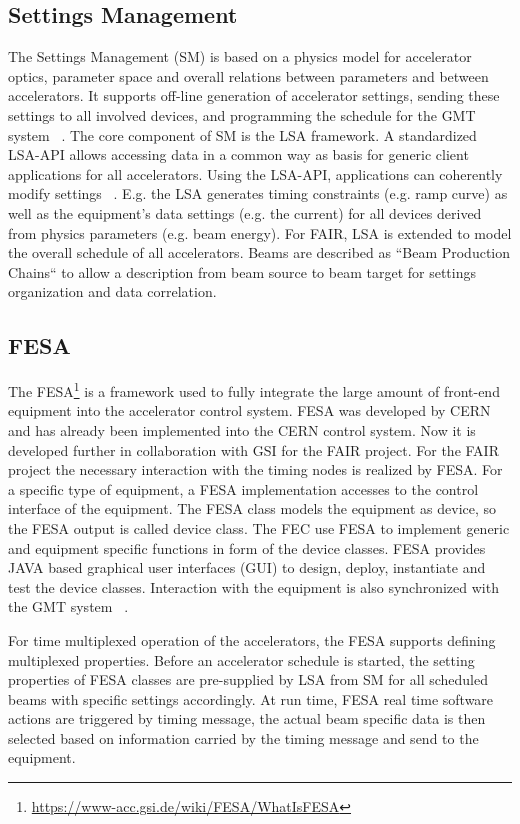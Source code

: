 \subsection{Settings Management}
The Settings Management (\gls{SM}) is based on a physics model for accelerator optics, parameter space and overall relations between parameters and between accelerators. It supports off-line generation of accelerator settings, sending these settings to all involved devices, and programming the schedule for the GMT system ~\cite{huhmann_fair_2013}. The core component of SM is the LSA framework. A standardized  LSA-\gls{API} allows accessing data in a common way as basis for generic client applications for all accelerators. Using the LSA-API, applications can coherently modify settings ~\cite{huhmann_fair_2013}. E.g. the LSA generates timing constraints (e.g. ramp curve) as well as the equipment's data settings (e.g. the current) for all devices derived from physics parameters (e.g. beam energy). For FAIR, LSA is extended to model the overall schedule of all accelerators. Beams are described as ``Beam Production Chains`` to allow a description from beam source to beam target for settings organization and data correlation.


\subsection{FESA}
The \gls{FESA}\footnote{\url{https://www-acc.gsi.de/wiki/FESA/WhatIsFESA}} is a framework used to fully integrate the large amount of front-end equipment into the accelerator control system. FESA was developed by CERN and has already been implemented into the \gls{CERN} control system. Now it is developed further in collaboration with GSI for the FAIR project. For the FAIR project the necessary interaction with the timing nodes is realized by FESA. For a specific type of equipment, a FESA implementation accesses to the control interface of the equipment. The FESA class models the equipment as device, so the FESA output is called device class. The \gls{FEC} use FESA to implement generic and equipment specific functions in form of the device classes. FESA provides JAVA based graphical user interfaces (GUI) to design, deploy, instantiate and test the device classes. Interaction with the equipment is also synchronized with the GMT system ~\cite{hoffmann_fesafront-end_2008}. 

For time multiplexed operation of the accelerators, the FESA supports defining multiplexed properties. Before an accelerator schedule is started, the setting properties of FESA classes are pre-supplied by LSA from SM for all scheduled beams with specific settings accordingly. At run time, FESA real time software actions are triggered by timing message, the actual beam specific data is then selected based on information carried by the timing message and send to the equipment. 

